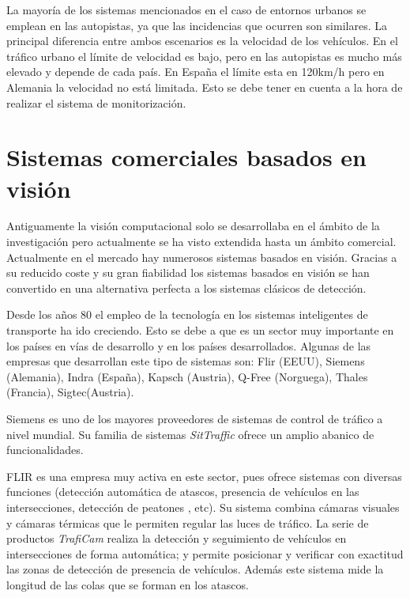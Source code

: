 La mayoría de los sistemas mencionados en el caso de entornos urbanos se emplean en las autopistas, ya que las incidencias que ocurren son similares. La principal diferencia entre ambos escenarios es la velocidad de los vehículos. En el tráfico urbano el límite de velocidad es bajo, pero en las autopistas es mucho más elevado y depende de cada país. En España el límite esta en 120km/h pero en Alemania la velocidad no está limitada. Esto se debe tener en cuenta a la hora de realizar el sistema de monitorización.

\section{Sistemas comerciales basados en visión}

Antiguamente la visión computacional solo se desarrollaba en el ámbito de la investigación pero actualmente se ha visto extendida hasta un ámbito comercial. Actualmente en el mercado hay numerosos sistemas basados en visión. Gracias a su reducido coste y su gran fiabilidad los sistemas basados en visión se han convertido en una alternativa perfecta a los sistemas clásicos de detección.

Desde los años 80 el empleo de la tecnología en los sistemas inteligentes de transporte ha ido creciendo. Esto se debe a que es un sector muy importante en los países en vías de desarrollo y en los países desarrollados. Algunas de las empresas que desarrollan este tipo de sistemas son: Flir (EEUU), Siemens (Alemania), Indra (España), Kapsch (Austria), Q-Free (Norguega), Thales (Francia), Sigtec(Austria).

Siemens es uno de los mayores proveedores de sistemas de control de tráfico a nivel mundial. Su familia de sistemas \textit{SitTraffic} ofrece un amplio abanico de funcionalidades.

FLIR es una empresa muy activa en este sector, pues ofrece sistemas con diversas funciones (detección automática de atascos, presencia de vehículos en las intersecciones, detección de peatones , etc).  Su sistema combina cámaras visuales y cámaras térmicas que le permiten regular las luces de tráfico. La serie de productos \textit{TrafiCam} realiza la detección y seguimiento de vehículos en intersecciones de forma automática; y permite posicionar y verificar con exactitud las zonas de detección de presencia de vehículos. Además este sistema mide la longitud de las colas que se forman en los atascos.

